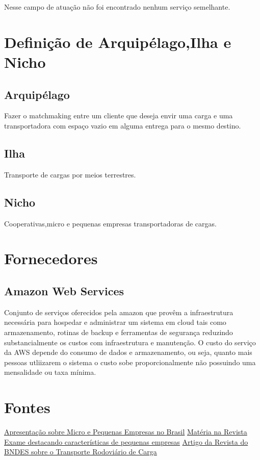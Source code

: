 Nesse campo de atuação não foi encontrado nenhum serviço semelhante.

\section{Definição de Arquipélago,Ilha e Nicho}
\subsection{Arquipélago}
  Fazer o matchmaking entre um cliente que deseja envir uma carga e uma transportadora com espaço vazio em alguma entrega para o mesmo destino.

\subsection{Ilha}
Transporte de cargas por meios terrestres.

\subsection{Nicho}
Cooperativas,micro e pequenas empresas transportadoras de cargas.


\section{Fornecedores}
\subsection{Amazon Web Services}
	 Conjunto de serviços oferecidos pela amazon que provêm a infraestrutura necessária para hospedar e administrar um sistema em cloud  tais como armazenamento, rotinas de backup e ferramentas de segurança reduzindo substancialmente os custos com infraestrutura e manutenção.\newline
	O custo do serviço  da AWS depende do consumo  de dados e armazenamento, ou seja, quanto mais pessoas utliizarem o sistema o custo sobe proporcionalmente não possuindo uma mensalidade ou taxa mínima.


\section{Fontes}

\href{http://www.slideshare.net/rafaelrezoliveira/micro-epequenasempresas}{Apresentação sobre Micro e Pequenas Empresas no Brasil}
\newline
\href{http://exame.abril.com.br/pme/noticias/o-raio-x-das-pequenas-empresas-brasileiras}{Matéria na Revista Exame destacando características de pequenas empresas}
\newline
\href{http://www.bndes.gov.br/SiteBNDES/export/sites/default/bndes_pt/Galerias/Arquivos/conhecimento/revista/rev2902.pdf}{Artigo da Revista do BNDES sobre o Transporte Rodoviário de Carga}
